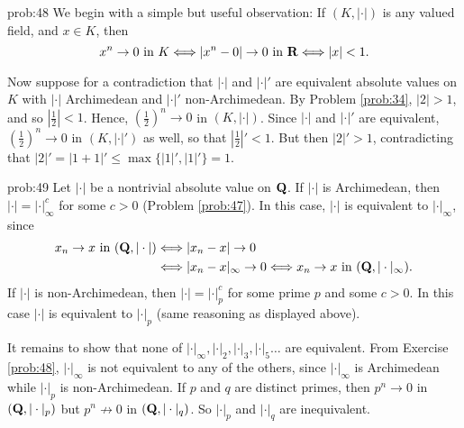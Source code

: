 \begin{sol}{prob:48} We begin with a simple but useful observation: If $(K,|\cdot|)$ is any valued field, and $x \in K$, then
\[ x^n \to 0 \text{ in $K$}\Longleftrightarrow |x^n-0| \to 0\text{ in $\mathbf{R}$} \Longleftrightarrow |x|< 1.\]

Now suppose for a contradiction that $|\cdot|$ and $|\cdot|'$ are equivalent absolute values on $K$ with $|\cdot|$ Archimedean and $|\cdot|'$ non-Archimedean. By Problem \ref{prob:34}, $|2| > 1$, and so $|\frac{1}{2}| < 1$. Hence, $(\frac{1}{2})^n \to 0$ in $(K,|\cdot|)$. Since $|\cdot|$ and $|\cdot|'$ are equivalent, $(\frac{1}{2})^n \to 0$ in $(K,|\cdot|')$ as well, so that $|\frac{1}{2}|' < 1$. But then $|2|'> 1$, contradicting that $|2|' = |1+1|' \le \max\{|1|'
,|1|'\} = 1$.  
\end{sol}

\begin{sol}{prob:49}  Let $|\cdot|$ be a nontrivial absolute value on $\mathbf{Q}$. If $|\cdot|$ is Archimedean, then $|\cdot| = |\cdot|_{\infty}^{c}$ for some $c>0$ (Problem \ref{prob:47}). In this case, $|\cdot|$ is equivalent to $|\cdot|_{\infty}$, since
\begin{align*} x_n\to x\text{ in $(\mathbf{Q},|\cdot|)$} &\Longleftrightarrow |x_n-x| \to 0 \\ &\Longleftrightarrow |x_n-x|_{\infty} \to 0 \Longleftrightarrow x_n \to x \text{ in $(\mathbf{Q},|\cdot|_{\infty})$}.\end{align*}
If $|\cdot|$ is non-Archimedean, then $|\cdot|=|\cdot|_p^{c}$ for some prime $p$ and some $c>0$. In this case $|\cdot|$ is equivalent to $|\cdot|_p$ (same reasoning as displayed above).

It remains to show that none of $|\cdot|_{\infty}, |\cdot|_2, |\cdot|_3, |\cdot|_5\dots$ are equivalent. From Exercise \ref{prob:48}, $|\cdot|_{\infty}$ is not equivalent to any of the others, since $|\cdot|_{\infty}$ is Archimedean while $|\cdot|_p$ is non-Archimedean. If $p$ and $q$ are distinct primes, then $p^n \to 0$ in $(\mathbf{Q},|\cdot|_p)$ but $p^n \not\to 0$ in $(\mathbf{Q},|\cdot|_q)$. So $|\cdot|_p$ and $|\cdot|_q$ are inequivalent.
\end{sol}

